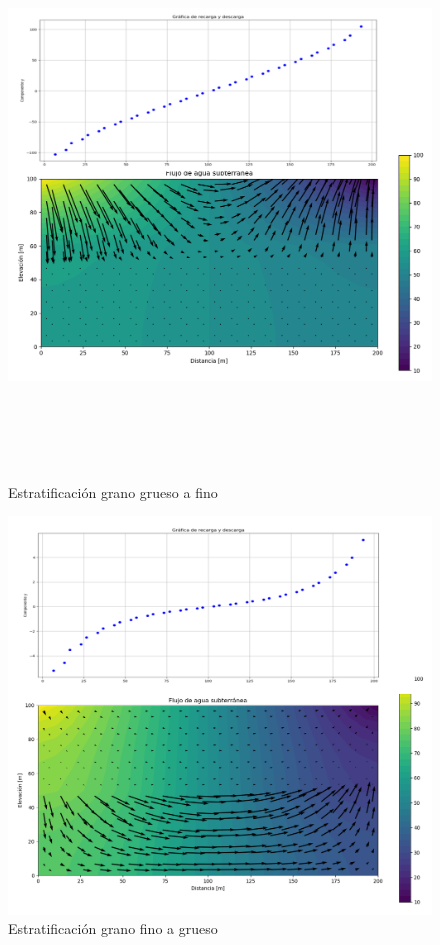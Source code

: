 \begin{figure}[H]
\centering
\includegraphics[height=15cm]{Figura_33e.png} 
\caption{Estratificación grano grueso a fino}
\label{Figura3:7c}
\end{figure}

\newpage
\begin{figure}[H]
\centering
\includegraphics[scale=0.55]{Figura_34d.png}
\caption{ Estratificación grano fino a grueso}
\label{Figura3:7b}
\end{figure}


